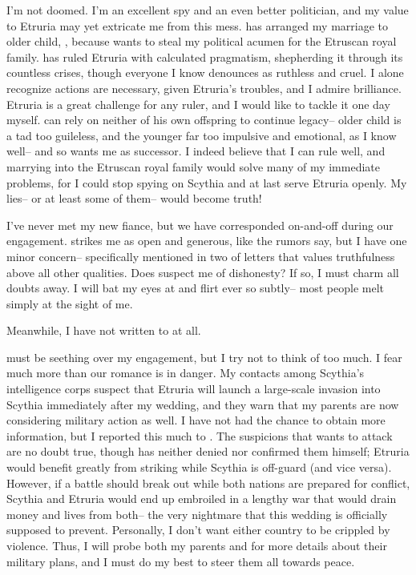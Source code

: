 \documentclass[char]{Kos}
\begin{document}
I'm not doomed. I'm an excellent spy and an even better politician, and my value to Etruria may yet extricate me from this mess. \cEtruriaKing{} has arranged my marriage to \cEtruriaKing{\their} older child, \cGroom{}, because \cEtruriaKing{\they} wants to steal my political acumen for the Etruscan royal family. \cEtruriaKing{\They} \cEtruriaKing{\themself} has ruled Etruria with calculated pragmatism, shepherding it through its countless crises, though everyone I know denounces \cEtruriaKing{\them} as ruthless and cruel. I alone recognize \cEtruriaKing{\their} actions are necessary, given Etruria's troubles, and I admire \cEtruriaKing{\their} brilliance. Etruria is a great challenge for any ruler, and I would like to tackle it one day myself. \cEtruriaKing{\They} can rely on neither of his own offspring to continue \cEtruriaKing{\their} legacy-- \cEtruriaKing{\their} older child is a tad too guileless, and the younger far too impulsive and emotional, as I know well-- and so \cEtruriaKing{\they} wants me as \cEtruriaKing{\their} successor. I indeed believe that I can rule well, and marrying into the Etruscan royal family would solve many of my immediate problems, for I could stop spying on Scythia and at last serve Etruria openly. My lies-- or at least some of them-- would become truth!
	
I've never met my new fiance, but we have corresponded on-and-off during our engagement. \cGroom{\They} strikes me as open and generous, like the rumors say, but I have one minor concern-- \cGroom{\they} specifically mentioned in two of \cGroom{\their} letters that \cGroom{\they} values truthfulness above all other qualities. Does \cGroom{\they} suspect me of dishonesty? If so, I must charm all \cGroom{\their} doubts away. I will bat my eyes at \cGroom{\them} and flirt ever so subtly-- most people melt simply at the sight of me.

Meanwhile, I have not written to \cPoet{} at all. 

\cPoet{\They} must be seething over my engagement, but I try not to think of \cPoet{\them} too much. I fear much more than our romance is in danger. My contacts among Scythia's intelligence corps suspect that Etruria will launch a large-scale invasion into Scythia immediately after my wedding, and they warn that my parents are now considering military action as well. I have not had the chance to obtain more information, but I reported this much to \cEtruriaKing{}. The suspicions that \cEtruriaKing{\they} wants to attack are no doubt true, though \cEtruriaKing{\they} has neither denied nor confirmed them himself; Etruria would benefit greatly from striking while Scythia is off-guard (and vice versa). However, if a battle should break out while both nations are prepared for conflict, Scythia and Etruria would end up embroiled in a lengthy war that would drain money and lives from both-- the very nightmare that this wedding is officially supposed to prevent. Personally, I don't want either country to be crippled by violence. Thus, I will probe both my parents and \cEtruriaKing{} for more details about their military plans, and I must do my best to steer them all towards peace.
\end{document}
